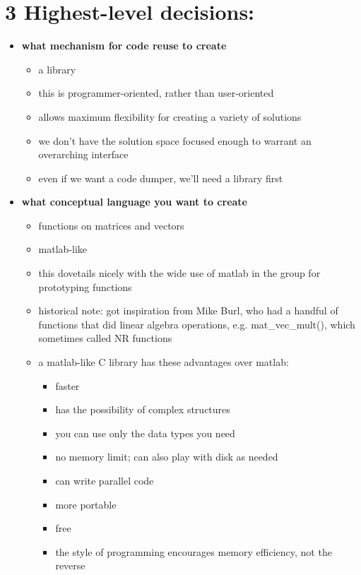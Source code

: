 \section*{3  Highest-level decisions:}
\begin{itemize}
\item {\bf what mechanism for code reuse to create}

	\begin{itemize}
	\item a library
	\item this is programmer-oriented, rather than user-oriented
	\item allows maximum flexibility for creating a variety of solutions
	\item we don't have the solution space focused enough to warrant an 
		overarching interface
	\item even if we want a code dumper, we'll need a library first
	\end{itemize}

\item {\bf what conceptual language you want to create}

	\begin{itemize}
	\item functions on matrices and vectors
	\item matlab-like
	\item this dovetails nicely with the wide use of matlab in the group for
			prototyping functions
	\item historical note:
			got inspiration from Mike Burl, who had a handful of functions
				that did linear algebra operations, e.g. mat\_vec\_mult(), 
				which sometimes called NR functions
	\item a matlab-like C library has these advantages over matlab:
		\begin{itemize}	
		\item faster
		\item has the possibility of complex structures
		\item you can use only the data types you need
		\item no memory limit; can also play with disk as needed
		\item can write parallel code
		\item more portable
		\item free
		\item the style of programming encourages memory efficiency, not the 
				reverse
		\end{itemize}
		

\end{itemize}
\end{itemize}
